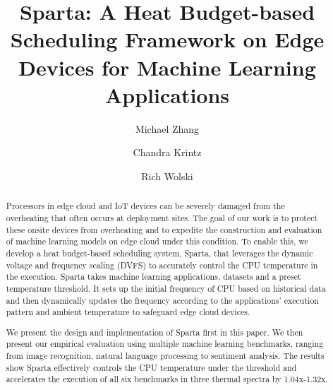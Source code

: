 \documentclass[runningheads]{llncs}
\begin{document}
%

\title{Sparta: A Heat Budget-based Scheduling Framework on Edge Devices for Machine Learning Applications}

%
%


\author{Michael Zhang \and
Chandra Krintz \and
Rich Wolski}


%
\maketitle              %
%


\begin{abstract}
Processors in edge cloud and IoT devices can be severely damaged from the overheating that often occurs at deployment sites. The goal of our work is to protect these onsite devices from overheating and to expedite the construction and evaluation of machine learning models on edge cloud under this condition. To enable this, we develop a heat budget-based scheduling system, Sparta, that leverages the dynamic voltage and frequency scaling (DVFS) to accurately control the CPU temperature in the execution. Sparta takes machine learning applications, datasets and a preset temperature threshold. It sets up the initial frequency of CPU based on historical data and then dynamically updates the frequency according to the applications' execution pattern and ambient temperature to safeguard edge cloud devices.

We present the design and implementation of Sparta first in this paper. We then present our empirical evaluation using multiple machine learning benchmarks, ranging from image recognition, natural language processing to sentiment analysis. The results show Sparta effectively controls the CPU temperature under the threshold and accelerates the execution of all six benchmarks in three thermal spectra by 1.04x-1.32x. 

\end{abstract}
%
%
%
\end{document}

